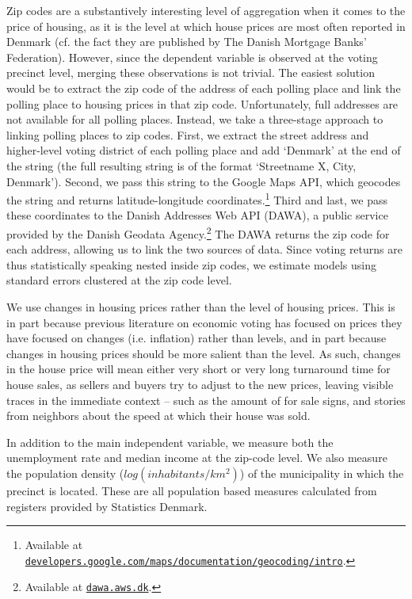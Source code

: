 \documentclass[12pt,a4paper]{article}
\begin{document}
Zip codes are a substantively interesting level of aggregation when it comes to the price of housing, as it is the level at which house prices are most often reported in Denmark (cf. the fact they are published by The Danish Mortgage Banks' Federation). However, since the dependent variable is observed at the voting precinct level, merging these observations is not trivial. The easiest solution would be to extract the zip code of the address of each polling place and link the polling place to housing prices in that zip code. Unfortunately, full addresses are not available for all polling places. Instead, we take a three-stage approach to linking polling places to zip codes. First, we extract the street address and higher-level voting district of each polling place and add `Denmark' at the end of the string (the full resulting string is of the format `Streetname X, City, Denmark'). Second, we pass this string to the Google Maps API, which geocodes the string and returns latitude-longitude coordinates.\footnote{Available at \texttt{\href{https://developers.google.com/maps/documentation/geocoding/intro}{developers.google.com/maps/documentation/geocoding/intro}}.} Third and last, we pass these coordinates to the Danish Addresses Web API (DAWA), a public service provided by the Danish Geodata Agency.\footnote{Available at \texttt{\href{http://dawa.aws.dk/}{dawa.aws.dk}}.} The DAWA returns the zip code for each address, allowing us to link the two sources of data. Since voting returns are thus statistically speaking nested inside zip codes, we estimate models using standard errors clustered at the zip code level.

We use changes in housing prices rather than the level of housing prices. This is in part because previous literature on economic voting has focused on prices they have focused on changes (i.e. inflation) rather than levels, and in part because changes in housing prices should be more salient than the level. As such, changes in the house price will mean either very short or very long turnaround time for house sales, as sellers and buyers try to adjust to the new prices, leaving visible traces in the immediate context -- such as the amount of for sale signs, and stories from neighbors about the speed at which their house was sold.

In addition to the main independent variable, we measure both the unemployment rate and median income at the zip-code level. We also measure the population density ($log(inhabitants/km^2)$) of the municipality in which the precinct is located. These are all population based measures calculated from registers provided by Statistics Denmark. 
\end{document}
